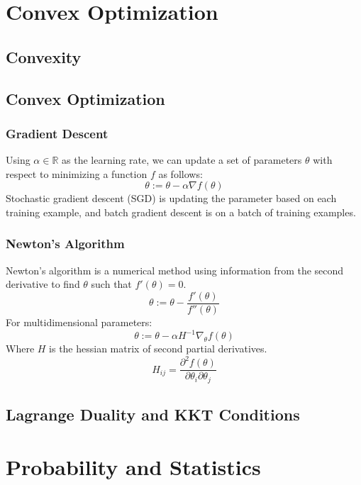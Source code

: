 \documentclass[twoside,twocolumn]{article}
\begin{document}
\section{Convex Optimization}
\subsection{Convexity}
\subsection{Convex Optimization}
\subsubsection{Gradient Descent}
Using $\alpha \in \mathbb{R}$ as the learning rate, we can update a set of
parameters $\theta$ with respect to minimizing a function $f$ as follows:
\begin{equation}
  \theta := \theta-\alpha\nabla f(\theta)
\end{equation}
Stochastic gradient descent (SGD) is updating the parameter based on each
training example, and batch gradient descent is on a batch of training
examples.
\subsubsection{Newton's Algorithm}
Newton's algorithm is a numerical method using information from the second
derivative to find $\theta$ such that $f'(\theta)=0$.
\begin{equation}
  \theta := \theta-\frac{f'(\theta)}{f''(\theta)}
\end{equation}
For multidimensional parameters:
\begin{equation}
  \theta := \theta-\alpha H^{-1} \nabla_\theta f(\theta)
\end{equation}
Where $H$ is the hessian matrix of second partial derivatives.
\begin{equation}
  H_{ij} = \frac { \partial ^ { 2 } f ( \theta ) } { \partial \theta _ { i } \partial \theta _ { j } }
\end{equation}
\subsection{Lagrange Duality and KKT Conditions}
\section{Probability and Statistics}
\end{document}
